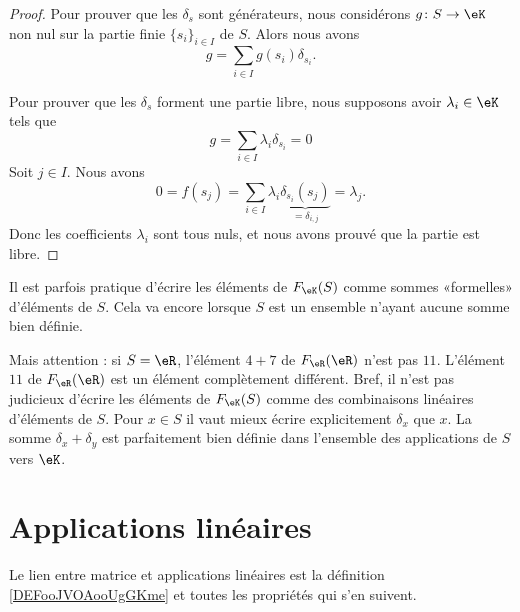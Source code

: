 \begin{proof}
	Pour prouver que les \( \delta_s\) sont générateurs, nous considérons \( g\colon S\to \eK\) non nul sur la partie finie \( \{ s_i \}_{i\in I}\) de \( S\). Alors nous avons
	\begin{equation}
		g=\sum_{i\in I}g(s_i)\delta_{s_i}.
	\end{equation}

	Pour prouver que les \( \delta_s\) forment une partie libre, nous supposons avoir \( \lambda_i\in \eK\) tels que
	\begin{equation}
		g=\sum_{i\in I}\lambda_i\delta_{s_i}=0
	\end{equation}
	Soit \( j\in I\). Nous avons
	\begin{equation}
		0=f(s_j)=\sum_{i\in I}\lambda_i \underbrace{\delta_{s_i}(s_j)}_{=\delta_{i,j}}=\lambda_j.
	\end{equation}
	Donc les coefficients \( \lambda_i\) sont tous nuls, et nous avons prouvé que la partie est libre.
\end{proof}

Il est parfois pratique d'écrire les éléments de \( F_{\eK}(S)\) comme sommes «formelles» d'éléments de \( S\). Cela va encore lorsque \( S\) est un ensemble n'ayant aucune somme bien définie.

Mais attention : si \( S=\eR\), l'élément \( 4+7\) de \( F_{\eR}(\eR)\) n'est pas \( 11\). L'élément \( 11\) de \( F_{\eR}(\eR)\) est un élément complètement différent. Bref, il n'est pas judicieux d'écrire les éléments de \( F_{\eK}(S)\) comme des combinaisons linéaires d'éléments de \( S\). Pour \( x\in S\) il vaut mieux écrire explicitement \( \delta_x\) que \( x\). La somme \( \delta_x+\delta_y\) est parfaitement bien définie dans l'ensemble des applications de \( S\) vers \( \eK\).

\section{Applications linéaires}

Le lien entre matrice et applications linéaires est la définition \ref{DEFooJVOAooUgGKme} et toutes les propriétés qui s'en suivent.

